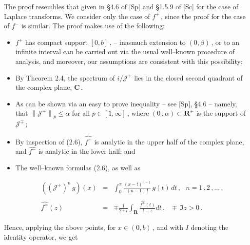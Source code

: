 \documentclass[10pt,a4paper]{amsart}
\begin{document}
 \begin{Proof} The proof resembles that given in \S 4.6 of [Sp] and
   \S1.5.9 of [Sc] for the case of Laplace transforms. We consider
   only the case of $f^+$\,, since the proof for the case of $f^-$ is
   similar.     The proof makes use of the following:
 \begin{itemize}
   \item $f^+$ has compact support $[0,b]$\,, -- inasmuch
       extension to $(0,\beta)$\,, or to an infinite interval can be
       carried out via the usual well--known procedure of analysis,
       and moreover, our assumptions are consistent with this possibility;
   \item By Theorem 2.4, the spectrum of $i/{\mathcal J}^+$ lies in
     the closed second quadrant of the complex plane, ${\mathbf C}$\,.
   \item As can be shown via an easy to prove inequality -- see
       [Sp], \S4.6 -- namely, that $\left\|{\mathcal
         J}^\mp\right\|_p \leq \alpha$ for all $p \in [1,\infty]$\,,
       where $(0\,,\alpha) \subset {\mathbf R}^+$ is the support of
       ${\mathcal J}^\mp$\,;
   \item By inspection of (2.6), $\widehat{f^+}$ is
     analytic in the upper half of the complex plane, and
      $\widehat{f^-}$ is analytic in the lower half; and
   \item The well--known formulas (2.6), as well as  

   \begin{equation} %
     \begin{array}{rcl}
          \displaystyle \left(\left({\mathcal J}^+\right)^n\,g\right)(x) & = & 
          \displaystyle \int_0^x 
          \frac{(x-t)^{n-1}}{(n-1)\,!} \, g(t) \, dt\,, \ \ \ n =
          1\,,2\,,\ldots\,,\\ 
           \\
          \widehat{f^\mp}(z)  & = & \displaystyle \mp
          \frac{1}{2\,\pi\,i} \int_{\mathbf R} 
          \frac{\widehat{f^\mp}(t)}{t - z} dt\,, \ \ \ \mp\,\Im z > 0\,.
     \end{array}
    \label{equation:2.11}
   \end{equation}
   
 \end{itemize}       

\noindent Hence, applying the above points, for $x \in (0,b)$\,, and with $I$
denoting the identity operator, we get


\end{Proof}
\end{document}
